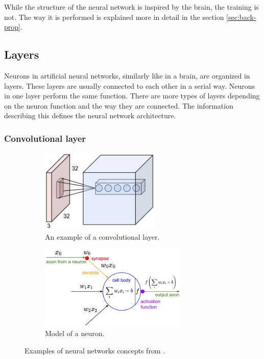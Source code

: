 \documentclass[a4paper,11pt,titlepage,twoside]{article}
\numberwithin{figure}{section}
\begin{document}
While the structure of the neural network is inspired by the brain, the training is not. The way it is performed is explained more in detail in the section \ref{sec:back-prop}.

\subsection{Layers}
Neurons in artificial neural networks, similarly like in a brain, are organized in layers. These layers are usually connected to each other in a serial way. Neurons in one layer perform the same function. There are more types of layers depending on the neuron function and the way they are connected. The information describing this defines the neural network architecture.


\subsubsection{Convolutional layer}

\begin{figure}[h!]
    \begin{subfigure}[Sample1]{0.5\linewidth}
    	\includegraphics[height=40mm]{fig/conv1.jpeg} 
        \caption{An example of a convolutional layer.}
        \label{fig:conv_layer}   
    \end{subfigure}
    \qquad
    \begin{subfigure}[Sample1]{0.5\linewidth} 
    	\includegraphics[height=40mm]{fig/conv2.jpeg}
        \caption{Model of a neuron.}   
        \label{fig:neuron}
    \end{subfigure} 
    \caption{Examples of neural networks concepts from \cite{karpathy2016cs231n}.}
\end{figure}
\end{document}
